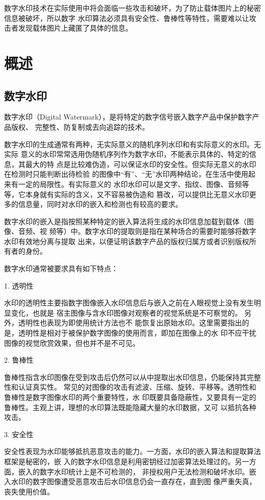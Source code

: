 \documentclass[a4paper,zihao=5,UTF8]{ctexart}
\begin{document}
数字水印技术在实际使用中将会面临一些攻击和破坏，为了防止载体图片上的秘密信息被破坏，所以数字
水印算法必须具有安全性、鲁棒性等特性，需要难以让攻击者发现载体图片上藏匿了具体的信息。

\section{概述}

\subsection{数字水印}

数字水印（Digital Watermark），是将特定的数字信号嵌入数字产品中保护数字产品版权、
完整性、防复制或去向追踪的技术。

数字水印的生成通常有两种，无实际意义的随机序列水印和有实际意义的水印。无实际
意义的水印常常选用伪随机序列作为数字水印，不能表示具体的、特定的信息，其最大的特
点是比较难伪造，可以保证水印的安全性。但实际无意义的水印在检测时只能判断出待检验
的图像中“有”、“无”水印两种结论，在生活中使用起来有一定的局限性。有实际意义的
水印水印可以是文字、指纹、图像、音频等等，它本身就有实际的含义，又不容易被伪造和
篡改，可以提供比无意义水印更多的信息量，同时对水印的嵌入和检测也有较高的要求。

数字水印的嵌入是指按照某种特定的嵌入算法将生成的水印信息加载到载体（图像、音频、视
频等）中。数字水印的提取则是指在某种场合的需要时能够将数字水印有效地分离与提取
出来，以便证明该数字产品的版权归属方或者识别版权所有者的身份。

数字水印通常被要求具有如下特点：
    
1. 透明性

    水印的透明性主要指数字图像嵌入水印信息后与嵌入之前在人眼视觉上没有发生明显变化，也就是
宿主图像与含水印图像对观察者的视觉系统是不可察觉的。 另外，透明性也表现为即使用统计方法也不
能恢复出原始水印。这里需要指出的是，透明性是相对于被保护数字图像的使用而言，即加在图像上的水
印不应干扰图像的视觉欣赏效果，但也并不是不可见。

2. 鲁棒性

    鲁棒性指含水印图像在受到攻击后仍然可以从中提取出水印信息，仍能保持其完整性和认证真实性。 
常见的对图像的攻击有滤波、压缩、旋转、平移等。透明性和鲁棒性是数字图像水印的两个重要特性，水
印既要具备隐蔽性，又要具有一定的鲁棒性。主观上讲，理想的水印算法既能隐藏大量的水印数据，又可
以抵抗各种攻击。
    
3. 安全性

    安全性表现为水印能够抵抗恶意攻击的能力。一方面，水印的嵌入算法和提取算法框架是秘密的，嵌
入的数字水印信息是利用密钥经过加密算法处理过的。另一方面，嵌入的数字水印统计上是不可检测的，
非授权用户无法检测和破坏水印。嵌入水印的数字图像遭受恶意攻击后水印信息仍会一直存在，直到图
像严重失真，丧失使用价值。
\end{document}
